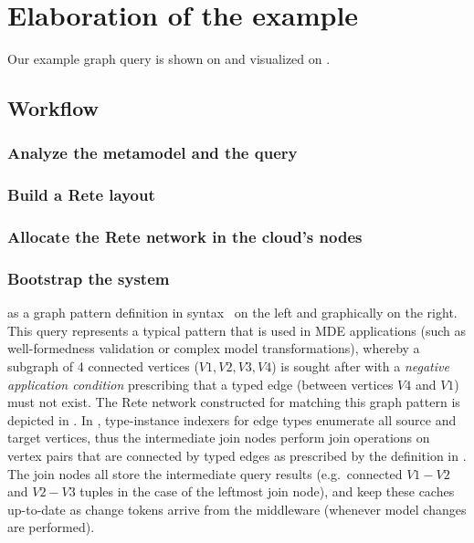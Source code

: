 \section{Elaboration of the example}
\label{sec:elaboration}

Our example graph query is shown on  and visualized on . 


\subsection{}



\subsection{Workflow}


\subsubsection{Analyze the metamodel and the query}


\subsubsection{Build a Rete layout}


\subsubsection{Allocate the Rete network in the cloud's nodes} 




\subsubsection{Bootstrap the system}
 


 
as a graph pattern definition in \eiq{} syntax~\cite{Bergmann:2010:IEM:1926458.1926467} on the left and graphically on the right. This query represents a typical pattern that is used in MDE applications (such as well-formedness validation or complex model transformations), whereby a subgraph of 4 connected vertices ($V1, V2, V3, V4$) is sought after with a \emph{negative application condition} prescribing that a typed edge (between vertices $V4$ and $V1$) must not exist.
The Rete network constructed for matching this graph pattern is depicted in . In \iqd{}, type-instance indexers for edge types enumerate all source and target vertices, thus the intermediate join nodes perform join operations on vertex pairs that are connected by typed edges as prescribed by the definition in . The join nodes all store the intermediate query results (e.g.\ connected $V1-V2$ and $V2-V3$ tuples in the case of the leftmost join node), and keep these caches up-to-date as change tokens arrive from the middleware (whenever model changes are performed).


